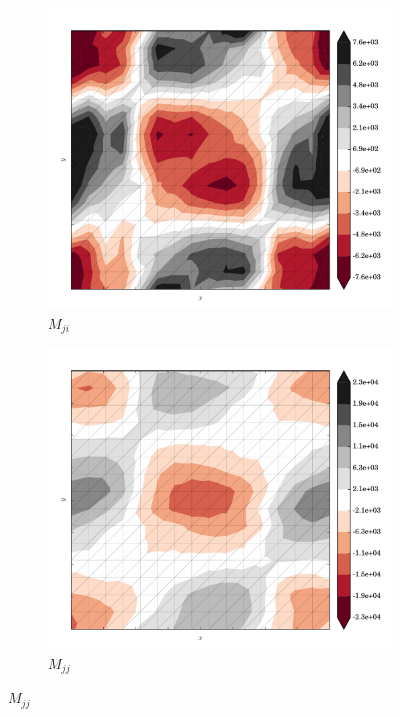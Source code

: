 \begin{figure}
  \begin{subfigure}[b]{0.3\linewidth}
    \includegraphics[width=\linewidth]{images/stress_balance/BP/M_ji.pdf}
  \caption{$M_{ji}$}
  \label{bp_M_ji}
  \end{subfigure}
  \begin{subfigure}[b]{0.3\linewidth}
    \includegraphics[width=\linewidth]{images/stress_balance/BP/M_jj.pdf}
  \caption{$M_{jj}$}
  \label{bp_M_jj}
  \end{subfigure}

\end{figure}
